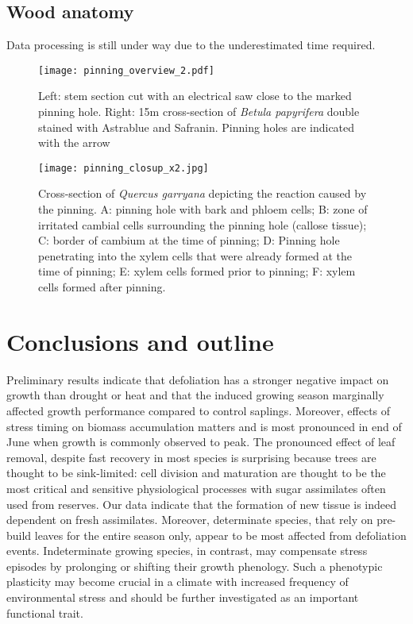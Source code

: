 \documentclass{article}
\begin{document}
			
				\subsection*{Wood anatomy}
				Data processing is still under way due to the underestimated time required.
				
				\begin{figure}[htbp]
					\centering
					\texttt{[image: pinning\_overview\_2.pdf]} 
					\caption{Left: stem section cut with an electrical saw close to the marked pinning hole. Right: 15\textmu m cross-section of \textit{Betula papyrifera} double stained with Astrablue and Safranin. Pinning holes are indicated with the arrow}
					\label{fig:pinning_overview_2}
				\end{figure}
				\begin{figure}[htbp]
					\centering
					\texttt{[image: pinning\_closup\_x2.jpg]} 
					\caption{Cross-section of \textit{Quercus garryana} depicting the reaction caused by the pinning. A: pinning hole with bark and phloem cells; B: zone of irritated cambial cells surrounding the pinning hole (callose tissue); C: border of cambium at the time of pinning; D: Pinning hole penetrating into the xylem cells that were already formed at the time of pinning; E: xylem cells formed prior to pinning; F: xylem cells formed after pinning. }
					\label{fig:pinning_closup_x2}
				\end{figure}
				
				
				
		\section*{Conclusions and outline}
			Preliminary results indicate that defoliation has a stronger negative impact on growth than drought or heat and that the induced growing season marginally affected growth performance compared to control saplings. Moreover, effects of stress timing on biomass accumulation matters and is most pronounced in end of June when growth is commonly observed to peak. The pronounced effect of leaf removal, despite fast recovery in most species is surprising because trees are thought to be sink-limited: cell division and maturation are thought to be the most critical and sensitive physiological processes with sugar assimilates often used from reserves. Our data indicate that the formation of new tissue is indeed dependent on fresh assimilates. Moreover, determinate species, that rely on pre-build leaves for the entire season only, appear to be most affected from defoliation events. Indeterminate growing species, in contrast, may compensate stress episodes by prolonging or shifting their growth phenology. Such a phenotypic plasticity may become crucial in a climate with increased frequency of environmental stress and should be further investigated as an important functional trait.\\
			
\end{document}
